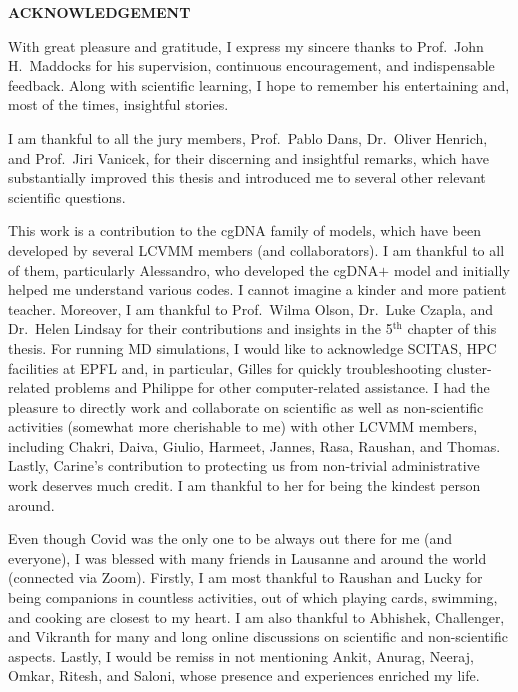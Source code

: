 %
{\centerline { {\textbf{ACKNOWLEDGEMENT}}}}
\vspace*{0.75cm}

\indent\hspace{0.05cm} With great pleasure and gratitude, I express my sincere thanks to  Prof.~John H.~Maddocks for his supervision, continuous encouragement, and indispensable feedback.
Along with scientific learning, I hope to remember his entertaining and, most of the times, insightful stories.

I am thankful to all the jury members, Prof.~Pablo Dans, Dr.~Oliver Henrich, and Prof.~Jiri Vanicek, for their discerning and insightful remarks, which have substantially improved this thesis and introduced me to several other relevant scientific questions.

This work is a contribution to the cgDNA family of models, which have been developed by several LCVMM members (and collaborators).
I am thankful to all of them, particularly Alessandro, who developed the cgDNA$+$ model and initially helped me understand various codes.
I cannot imagine a kinder and more patient teacher.
Moreover, I am thankful to Prof.~Wilma Olson, Dr.~Luke Czapla, and Dr.~Helen Lindsay for their contributions and insights in the 5$^\text{th}$ chapter of this thesis.
For running MD simulations, I would like to acknowledge SCITAS, HPC facilities at EPFL and, in particular, Gilles for quickly troubleshooting cluster-related problems and Philippe for other computer-related assistance.
I had the pleasure to directly work and collaborate on scientific as well as non-scientific activities (somewhat more cherishable to me) with other LCVMM members, including Chakri, Daiva, Giulio, Harmeet, Jannes, Rasa, Raushan, and Thomas.
Lastly, Carine's contribution to protecting us from non-trivial administrative work deserves much credit.
I am thankful to her for being the kindest person around.

Even though Covid was the only one to be always out there for me (and everyone), I was blessed with many friends in Lausanne and around the world (connected via Zoom).
Firstly, I am most thankful to Raushan and Lucky for being companions in countless activities, out of which playing cards, swimming, and cooking are closest to my heart.
I am also thankful to Abhishek, Challenger, and Vikranth for many and long online discussions on scientific and non-scientific aspects.
Lastly, I would be remiss in not mentioning Ankit, Anurag, Neeraj, Omkar, Ritesh, and Saloni, whose presence and experiences enriched my life.

